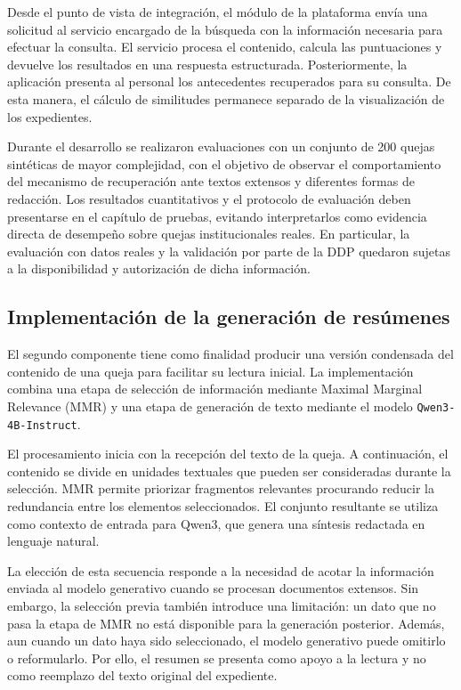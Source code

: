 Desde el punto de vista de integración, el módulo de la plataforma envía una solicitud al servicio encargado de la búsqueda con la información necesaria para efectuar la consulta. El servicio procesa el contenido, calcula las puntuaciones y devuelve los resultados en una respuesta estructurada. Posteriormente, la aplicación presenta al personal los antecedentes recuperados para su consulta. De esta manera, el cálculo de similitudes permanece separado de la visualización de los expedientes.


Durante el desarrollo se realizaron evaluaciones con un conjunto de 200 quejas sintéticas de mayor complejidad, con el objetivo de observar el comportamiento del mecanismo de recuperación ante textos extensos y diferentes formas de redacción. Los resultados cuantitativos y el protocolo de evaluación deben presentarse en el capítulo de pruebas, evitando interpretarlos como evidencia directa de desempeño sobre quejas institucionales reales. En particular, la evaluación con datos reales y la validación por parte de la DDP quedaron sujetas a la disponibilidad y autorización de dicha información.

\subsection{Implementación de la generación de resúmenes}
\label{subsec:implementacion_resumenes}

El segundo componente tiene como finalidad producir una versión condensada del contenido de una queja para facilitar su lectura inicial. La implementación combina una etapa de selección de información mediante Maximal Marginal Relevance (MMR) y una etapa de generación de texto mediante el modelo \texttt{Qwen3-4B-Instruct}.

El procesamiento inicia con la recepción del texto de la queja. A continuación, el contenido se divide en unidades textuales que pueden ser consideradas durante la selección. MMR permite priorizar fragmentos relevantes procurando reducir la redundancia entre los elementos seleccionados. El conjunto resultante se utiliza como contexto de entrada para Qwen3, que genera una síntesis redactada en lenguaje natural.

La elección de esta secuencia responde a la necesidad de acotar la información enviada al modelo generativo cuando se procesan documentos extensos. Sin embargo, la selección previa también introduce una limitación: un dato que no pasa la etapa de MMR no está disponible para la generación posterior. Además, aun cuando un dato haya sido seleccionado, el modelo generativo puede omitirlo o reformularlo. Por ello, el resumen se presenta como apoyo a la lectura y no como reemplazo del texto original del expediente.

